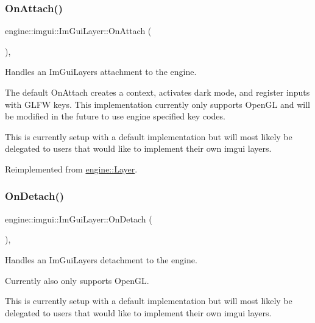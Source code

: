 \subsubsection{\texorpdfstring{On\+Attach()}{OnAttach()}}
{\footnotesize\ttfamily engine\+::imgui\+::\+Im\+Gui\+Layer\+::\+On\+Attach (\begin{DoxyParamCaption}{ }\end{DoxyParamCaption})\hspace{0.3cm}{\ttfamily [override]}, {\ttfamily [virtual]}}



Handles an Im\+Gui\+Layers attachment to the engine. 

The default On\+Attach creates a context, activates dark mode, and register inputs with G\+L\+FW keys. This implementation currently only supports Open\+GL and will be modified in the future to use engine specified key codes.

This is currently setup with a default implementation but will most likely be delegated to users that would like to implement their own imgui layers. 

Reimplemented from \hyperlink{classengine_1_1Layer_ace68c1d4e441165d6741a74d4b11c7f0}{engine\+::\+Layer}.

\mbox{\label{classengine_1_1imgui_1_1ImGuiLayer_ad443a984abe93f4101fdbadcea01bf9b}} 
\subsubsection{\texorpdfstring{On\+Detach()}{OnDetach()}}
{\footnotesize\ttfamily engine\+::imgui\+::\+Im\+Gui\+Layer\+::\+On\+Detach (\begin{DoxyParamCaption}{ }\end{DoxyParamCaption})\hspace{0.3cm}{\ttfamily [override]}, {\ttfamily [virtual]}}



Handles an Im\+Gui\+Layers detachment to the engine. 

Currently also only supports Open\+GL.

This is currently setup with a default implementation but will most likely be delegated to users that would like to implement their own imgui layers. 

